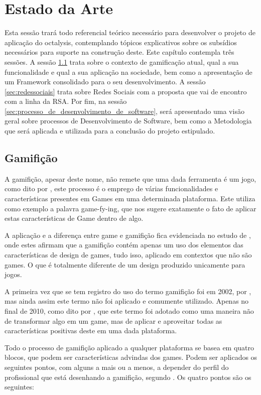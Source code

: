 \chapter[Estado da Arte]{Estado da Arte}
Esta sessão trará todo referencial teórico necessário para desenvolver o projeto
de aplicação do octalysis, contemplando tópicos explicativos sobre os subsídios
necessários para suporte na construção deste. Este capítulo contempla três sessões.
A sessão \ref{sec:gamifição} trata sobre o contexto de gamificação atual, qual a
sua funcionalidade e qual a sua aplicação na sociedade, bem como a apresentação
de um Framework consolidado para o seu desenvolvimento. A sessão \ref{sec:redessociais}
trata sobre Redes Sociais com a proposta que vai de encontro com a linha da RSA.
Por fim, na sessão \ref{sec:processo_de_desenvolvimento_de_software},
será apresentado uma visão geral sobre processos de
Desenvolvimento de Software, bem como a Metodologia que será aplicada e utilizada
para a conclusão do projeto estipulado.

\section{Gamifição}
\label{sec:gamifição}
A gamifição, apesar deste nome, não remete que uma dada ferramenta é um jogo,
como dito por \cite{popularitygamification}, este processo é o emprego de
várias funcionalidades e características presentes em Games em uma determinada
plataforma. Este utiliza como exemplo a palavra game-fy-ing, que nos sugere
exatamente o fato de aplicar estas características de Game dentro de algo.

A aplicação e a diferença entre game e gamifição fica evidenciada
no estudo de \cite{deterding2011gamification}, onde estes afirmam que a gamifição contém  apenas
um uso dos elementos das características de design de games, tudo isso,
aplicado em contextos que não são games. O que é totalmente diferente
de um design produzido unicamente para jogos.

A primeira vez que se tem registro do uso do termo gamifição foi em 2002,
por \cite{pelling}, mas ainda assim este termo não foi aplicado e comumente
utilizado. Apenas no final de 2010, como dito por \cite{deterding2011gamification}, que
este termo foi adotado como uma maneira não de transformar algo em um game,
mas de aplicar e aproveitar todas as características positivas deste em uma dada
plataforma.

Todo o processo de gamifição aplicado a qualquer plataforma se basea em
quatro blocos, que podem ser características advindas dos games. Podem ser
aplicados os seguintes pontos, com alguns a mais ou a menos, a depender
do perfil do profissional que está desenhando a gamifição, segundo \cite{mcgonigal2011reality}.
Os quatro pontos são os seguintes:

